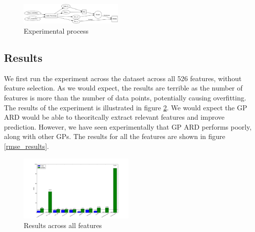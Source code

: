 \documentclass{article}
\begin{document}
	\begin{figure}[h]
 		\begin{center}
		\includegraphics[width=0.45\textwidth]{process} 
  		\end{center}
  		\caption{Experimental process}
  		\label{process} 
 	\end{figure}

	\subsection{Results}
	We first run the experiment across the dataset across all 526 features, without feature selection. As we would expect\cite{Cawley2014}, the results are terrible as the number of features is more than the number of 
	data points, potentially
	 causing overfitting. The results of the experiment is illustrated in figure \ref{results_all}. We would expect the GP ARD would be able to theoritcally extract relevant features and improve
	  prediction. However, we have seen experimentally that GP ARD performs poorly, along with other GPs. The results for all the features are shown in figure \ref{rmse_results}.

	\begin{figure}[h]
 		\begin{center}
		\includegraphics[width=0.5\textwidth]{results_all} 
  		\end{center}
  		\caption{Results across all features}
  		\label{results_all}
 	\end{figure}
	
\end{document}
